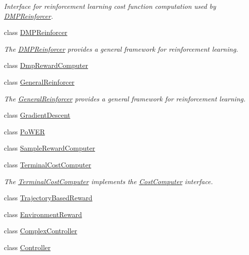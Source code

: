 \begin{DoxyCompactItemize}
\begin{DoxyCompactList}\small\item\em Interface for reinforcement learning cost function computation used by \hyperlink{classkukadu_1_1DMPReinforcer}{D\-M\-P\-Reinforcer}. \end{DoxyCompactList}\item 
class \hyperlink{classkukadu_1_1DMPReinforcer}{D\-M\-P\-Reinforcer}
\begin{DoxyCompactList}\small\item\em The \hyperlink{classkukadu_1_1DMPReinforcer}{D\-M\-P\-Reinforcer} provides a general framework for reinforcement learning. \end{DoxyCompactList}\item 
class \hyperlink{classkukadu_1_1DmpRewardComputer}{Dmp\-Reward\-Computer}
\item 
class \hyperlink{classkukadu_1_1GeneralReinforcer}{General\-Reinforcer}
\begin{DoxyCompactList}\small\item\em The \hyperlink{classkukadu_1_1GeneralReinforcer}{General\-Reinforcer} provides a general framework for reinforcement learning. \end{DoxyCompactList}\item 
class \hyperlink{classkukadu_1_1GradientDescent}{Gradient\-Descent}
\item 
class \hyperlink{classkukadu_1_1PoWER}{Po\-W\-E\-R}
\item 
class \hyperlink{classkukadu_1_1SampleRewardComputer}{Sample\-Reward\-Computer}
\item 
class \hyperlink{classkukadu_1_1TerminalCostComputer}{Terminal\-Cost\-Computer}
\begin{DoxyCompactList}\small\item\em The \hyperlink{classkukadu_1_1TerminalCostComputer}{Terminal\-Cost\-Computer} implements the \hyperlink{classkukadu_1_1CostComputer}{Cost\-Computer} interface. \end{DoxyCompactList}\item 
class \hyperlink{classkukadu_1_1TrajectoryBasedReward}{Trajectory\-Based\-Reward}
\item 
class \hyperlink{classkukadu_1_1EnvironmentReward}{Environment\-Reward}
\item 
class \hyperlink{classkukadu_1_1ComplexController}{Complex\-Controller}
\item 
class \hyperlink{classkukadu_1_1Controller}{Controller}
\item 

\end{DoxyCompactItemize}
